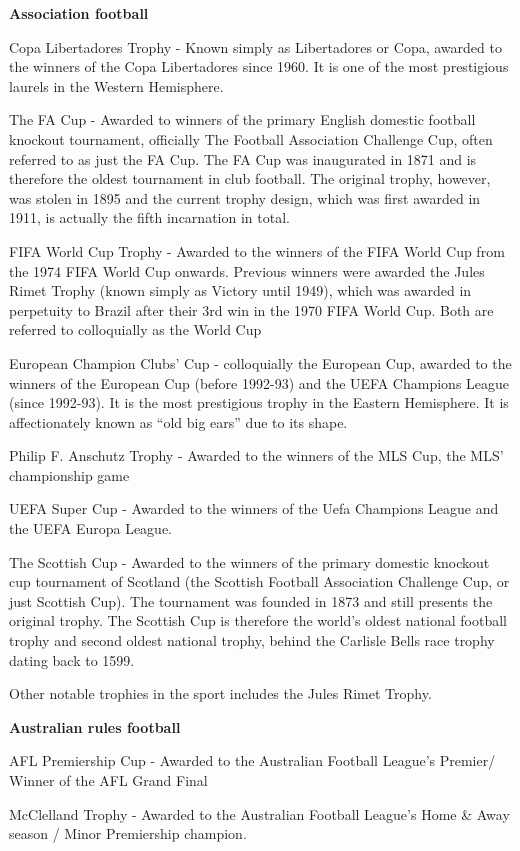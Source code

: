 \documentclass[
  openany]{book}
\begin{document}
\textbf{Association football}

Copa Libertadores Trophy - Known simply as Libertadores or Copa, awarded to the winners of the Copa Libertadores since 1960. It is one of the most prestigious laurels in the Western Hemisphere.

The FA Cup - Awarded to winners of the primary English domestic football knockout tournament, officially The Football Association Challenge Cup, often referred to as just the FA Cup. The FA Cup was inaugurated in 1871 and is therefore the oldest tournament in club football. The original trophy, however, was stolen in 1895 and the current trophy design, which was first awarded in 1911, is actually the fifth incarnation in total.

FIFA World Cup Trophy - Awarded to the winners of the FIFA World Cup from the 1974 FIFA World Cup onwards. Previous winners were awarded the Jules Rimet Trophy (known simply as Victory until 1949), which was awarded in perpetuity to Brazil after their 3rd win in the 1970 FIFA World Cup. Both are referred to colloquially as the World Cup

European Champion Clubs' Cup - colloquially the European Cup, awarded to the winners of the European Cup (before 1992-93) and the UEFA Champions League (since 1992-93). It is the most prestigious trophy in the Eastern Hemisphere. It is affectionately known as ``old big ears'' due to its shape.

Philip F. Anschutz Trophy - Awarded to the winners of the MLS Cup, the MLS' championship game

UEFA Super Cup - Awarded to the winners of the Uefa Champions League and the UEFA Europa League.

The Scottish Cup - Awarded to the winners of the primary domestic knockout cup tournament of Scotland (the Scottish Football Association Challenge Cup, or just Scottish Cup). The tournament was founded in 1873 and still presents the original trophy. The Scottish Cup is therefore the world's oldest national football trophy and second oldest national trophy, behind the Carlisle Bells race trophy dating back to 1599.

Other notable trophies in the sport includes the Jules Rimet Trophy.

\textbf{Australian rules football}

AFL Premiership Cup - Awarded to the Australian Football League's Premier/ Winner of the AFL Grand Final

McClelland Trophy - Awarded to the Australian Football League's Home \& Away season / Minor Premiership champion.
\end{document}
